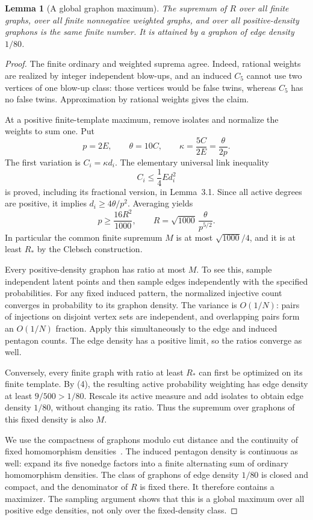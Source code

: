 \documentclass[11pt]{amsart}
\newtheorem{lemma}[theorem]{Lemma}
\theoremstyle{definition}
\theoremstyle{remark}
\begin{document}
\begin{lemma}[A global graphon maximum]\label{lem:global-maximum}
The supremum of \(R\) over all finite graphs, over all finite nonnegative
weighted graphs, and over all positive-density graphons is the same finite
number. It is attained by a graphon of edge density \(1/80\).
\end{lemma}
\begin{proof}
The finite ordinary and weighted suprema agree. Indeed, rational weights
are realized by integer independent blow-ups, and an induced \(C_5\)
cannot use two vertices of one blow-up class: those vertices would be
false twins, whereas \(C_5\) has no false twins. Approximation by rational
weights gives the claim.

At a positive finite-template maximum, remove isolates and normalize the
weights to sum one. Put
\[
 p=2E,\qquad \theta=10C,\qquad
 \kappa=\frac{5C}{2E}=\frac{\theta}{2p}.
\]
The first variation is \(C_i=\kappa d_i\). The elementary universal link
inequality
\begin{equation}
 C_i\le\frac14Ed_i^2\tag{3}
\end{equation}
is proved, including its fractional version, in Lemma~3.1. Since all
active degrees are positive, it implies \(d_i\ge4\theta/p^2\). Averaging
yields
\begin{equation}
 p\ge\frac{16R^2}{1000},\qquad
 R=\sqrt{1000}\,\frac{\theta}{p^{5/2}}.\tag{4}
\end{equation}
In particular the common finite supremum \(M\) is at most
\(\sqrt{1000}/4\), and it is at least \(R_*\) by the Clebsch construction.

Every positive-density graphon has ratio at most \(M\). To see this,
sample independent latent points and then sample edges independently with
the specified probabilities. For any fixed induced pattern, the normalized
injective count converges in probability to its graphon density. The
variance is \(O(1/N)\): pairs of injections on disjoint vertex sets are
independent, and overlapping pairs form an \(O(1/N)\) fraction. Apply this
simultaneously to the edge and induced pentagon counts. The edge density
has a positive limit, so the ratios converge as well.

Conversely, every finite graph with ratio at least \(R_*\) can first be
optimized on its finite template. By (4), the resulting active probability
weighting has edge density at least \(9/500>1/80\). Rescale its active
measure and add isolates to obtain edge density \(1/80\), without changing
its ratio. Thus the supremum over graphons of this fixed density is also
\(M\).

We use the compactness of graphons modulo cut distance
\cite[Theorem~5.1]{LovaszSzegedy2007} and the continuity of fixed
homomorphism densities~\cite{LovaszSzegedy2006}. The induced pentagon
density is continuous as well: expand its five nonedge factors into a
finite alternating sum of ordinary homomorphism densities. The class of
graphons of edge density \(1/80\) is closed and compact, and the
denominator of \(R\) is fixed there. It therefore contains a maximizer.
The sampling argument shows that this is a global maximum over all
positive edge densities, not only over the fixed-density class.
\end{proof}
\end{document}

